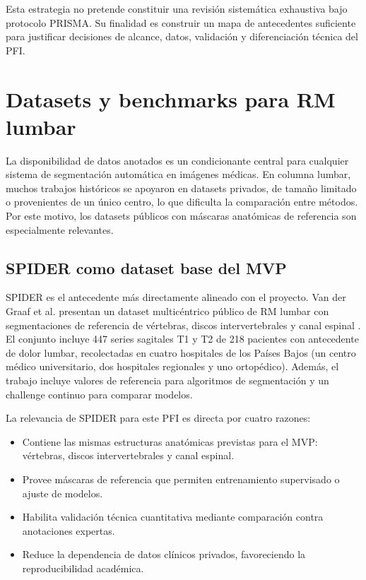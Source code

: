 Esta estrategia no pretende constituir una revisión sistemática exhaustiva bajo protocolo PRISMA. Su finalidad es construir un mapa de antecedentes suficiente para justificar decisiones de alcance, datos, validación y diferenciación técnica del PFI.

\section{Datasets y benchmarks para RM lumbar}

La disponibilidad de datos anotados es un condicionante central para cualquier sistema de segmentación automática en imágenes médicas. En columna lumbar, muchos trabajos históricos se apoyaron en datasets privados, de tamaño limitado o provenientes de un único centro, lo que dificulta la comparación entre métodos. Por este motivo, los datasets públicos con máscaras anatómicas de referencia son especialmente relevantes.

\subsection{SPIDER como dataset base del MVP}

SPIDER es el antecedente más directamente alineado con el proyecto. Van der Graaf et al. presentan un dataset multicéntrico público de RM lumbar con segmentaciones de referencia de vértebras, discos intervertebrales y canal espinal \parencite{vandergraaf_spider_2024}. El conjunto incluye 447 series sagitales T1 y T2 de 218 pacientes con antecedente de dolor lumbar, recolectadas en cuatro hospitales de los Países Bajos (un centro médico universitario, dos hospitales regionales y uno ortopédico). Además, el trabajo incluye valores de referencia para algoritmos de segmentación y un challenge continuo para comparar modelos.

La relevancia de SPIDER para este PFI es directa por cuatro razones:

\begin{itemize}
  \item Contiene las mismas estructuras anatómicas previstas para el MVP: vértebras, discos intervertebrales y canal espinal.
  \item Provee máscaras de referencia que permiten entrenamiento supervisado o ajuste de modelos.
  \item Habilita validación técnica cuantitativa mediante comparación contra anotaciones expertas.
  \item Reduce la dependencia de datos clínicos privados, favoreciendo la reproducibilidad académica.
\end{itemize}

